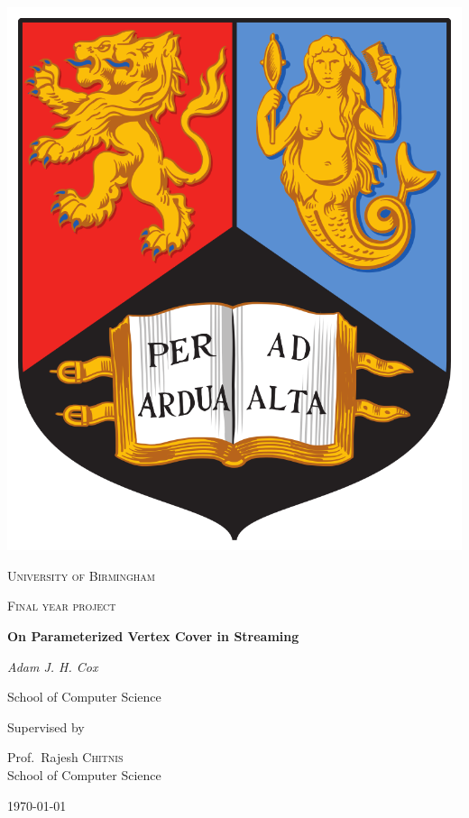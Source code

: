 \begin{titlepage}


\thispagestyle{empty}
\setlength\headheight{0pt}
\begin{center}

    \center\includegraphics[width=0.25\linewidth]{img/uob.PNG}

    \vspace{0.25cm}
    {\scshape\LARGE University of Birmingham \par}
    \vspace{0.25cm}
    {\scshape\Large Final year project\par}
    \vspace{0.5cm}

    {\Large\bfseries On Parameterized Vertex Cover in Streaming\par}

    \vspace{0.5cm}
    {\Large\itshape Adam J. H. Cox\par}
    School of Computer Science
    \vspace{0.25cm}

    \vspace{1cm}
    Supervised by\par
    Prof.~Rajesh \textsc{Chitnis} \\
    School of Computer Science\par
    \vspace{1.5cm}
    \large
    \today

\end{center}

\clearpage
\restoregeometry
\end{titlepage}
